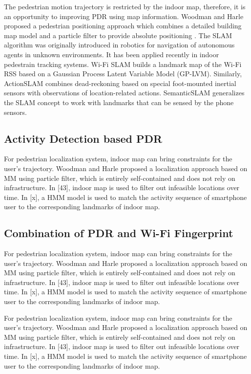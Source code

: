\documentclass[conference]{IEEEtran}
\begin{document}
The pedestrian motion trajectory is restricted by the indoor map, therefore, it is an opportunity to improving PDR using map information. Woodman and Harle proposed a pedestrian positioning approach which combines a detailed building map model and a particle filter to provide absolute positioning \cite{woodman2008pedestrian}. 
The SLAM algorithm was originally introduced in robotics for navigation of autonomous agents in unknown environments. It has been applied recently in indoor pedestrain tracking systems. Wi-Fi SLAM builds a landmark map of the Wi-Fi RSS based on a Gaussian Process Latent Variable Model (GP-LVM). Similarly, ActionSLAM combines dead-reckoning based on special foot-mounted inertial sensors with observations of location-related actions. SemanticSLAM generalizes the SLAM concept to work with landmarks that can be sensed by the phone sensors\cite{xiao2014lightweight}.

\subsection{Activity Detection based PDR}

For pedestrian localization system, indoor map can bring constraints for the user's trajectory. Woodman and Harle proposed a localization approach based on MM using particle filter, which is entirely self-contained and does not rely on infrastructure. In [43], indoor map is used to filter out infeasible locations over time. In [x], a HMM model is used to match the activity sequence of smartphone user to the corresponding landmarks of indoor map. 

\subsection{Combination of PDR and Wi-Fi Fingerprint}
For pedestrian localization system, indoor map can bring constraints for the user's trajectory. Woodman and Harle proposed a localization approach based on MM using particle filter, which is entirely self-contained and does not rely on infrastructure. In [43], indoor map is used to filter out infeasible locations over time. In [x], a HMM model is used to match the activity sequence of smartphone user to the corresponding landmarks of indoor map.

For pedestrian localization system, indoor map can bring constraints for the user's trajectory. Woodman and Harle proposed a localization approach based on MM using particle filter, which is entirely self-contained and does not rely on infrastructure. In [43], indoor map is used to filter out infeasible locations over time. In [x], a HMM model is used to match the activity sequence of smartphone user to the corresponding landmarks of indoor map\cite{radu2013himloc}.
\end{document}
